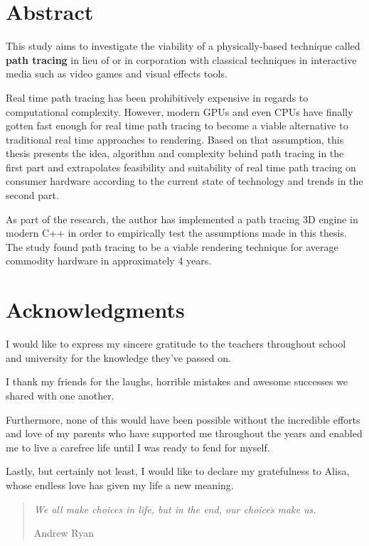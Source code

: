\documentclass[
  twoside,
  11pt, a4paper,
  footinclude=true,
  headinclude=true,
  cleardoublepage=empty
]{scrreprt}
\begin{document}


\chapter*{Abstract}
\onehalfspace
This study aims to investigate the viability of a physically-based technique called
\textbf{path tracing} in lieu of or in corporation with classical techniques in interactive media such as video
games and visual effects tools.

Real time path tracing has been prohibitively expensive in regards to computational
complexity. However, modern GPUs and even CPUs have finally gotten fast enough for real time path
tracing to become a viable alternative to traditional real time approaches to rendering.  Based on
that assumption, this thesis presents the idea, algorithm and complexity behind path tracing in the
first part and extrapolates feasibility and suitability of real time path tracing on consumer
hardware according to the current state of technology and trends in the second part.

As part of the research, the author has implemented a path tracing 3D engine in modern C++ in order
to empirically test the assumptions made in this thesis. The study found path tracing
to be a viable rendering technique for average commodity hardware in approximately 4 years.
\singlespace

\chapter*{Acknowledgments}
\doublespacing
I would like to express my sincere gratitude to the teachers throughout school and university for
the knowledge they've passed on.

I thank my friends for the laughs, horrible mistakes and awesome successes we shared with
one another.

Furthermore, none of this would have been possible without the incredible efforts and love of my
parents who have supported me throughout the years and enabled me to live a carefree life until I
was ready to fend for myself.

Lastly, but certainly not least, I would like to declare my gratefulness to Alisa, whose endless love
has given my life a new meaning.

\singlespace

\clearpage
\vspace*{\fill}
\thispagestyle{empty} %
\begin{quotation}
    \em
    We all make choices in life, but in the end, our choices make us.

    \medskip
    \raggedleft
    Andrew Ryan
\end{quotation}
\vspace*{\fill}
\end{document}
